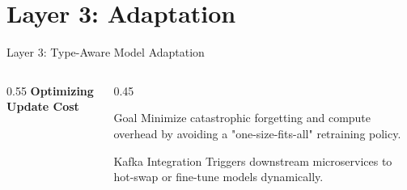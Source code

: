 \documentclass[aspectratio=169,10pt]{beamer}
\begin{document}
\section{Layer 3: Adaptation}

\begin{frame}{Layer 3: Type-Aware Model Adaptation}
	\begin{columns}[c]
		\begin{column}{0.55\textwidth}
			\Large \textbf{Optimizing Update Cost}
			
			\vspace{1em}
			\normalsize
			\begin{table}[]
			\end{table}
		\end{column}
		\begin{column}{0.45\textwidth}
			\begin{exampleblock}{Goal}
				Minimize catastrophic forgetting and compute overhead by avoiding a "one-size-fits-all" retraining policy.
			\end{exampleblock}
			
			\vspace{1em}
			\begin{alertblock}{Kafka Integration}
				Triggers downstream microservices to hot-swap or fine-tune models dynamically.
			\end{alertblock}
		\end{column}
	\end{columns}
\end{frame}
\end{document}
